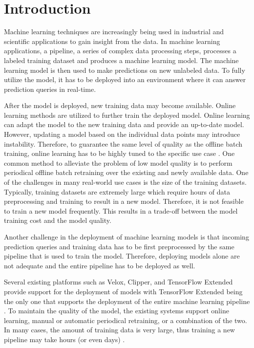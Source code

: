 \section{Introduction} \label{introduction}
Machine learning techniques are increasingly being used in industrial and scientific applications to gain insight from the data.
In machine learning applications, a pipeline, a series of complex data processing steps, processes a labeled training dataset and produces a machine learning model.
The machine learning model is then used to make predictions on new unlabeled data.
To fully utilize the model, it has to be deployed into an environment where it can answer prediction queries in real-time.

After the model is deployed, new training data may become available.
Online learning methods are utilized to further train the deployed model.
Online learning can adapt the model to the new training data and provide an up-to-date model.
However, updating a model based on the individual data points may introduce instability.
Therefore, to guarantee the same level of quality as the offline batch training, online learning has to be highly tuned to the specific use case \cite{ma2009identifying, macmahan2013}.
One common method to alleviate the problem of low model quality is to perform periodical offline batch retraining over the existing and newly available data.
One of the challenges in many real-world use cases is the size of the training datasets.
Typically, training datasets are extremely large which require hours of data preprocessing and training to result in a new model.
Therefore, it is not feasible to train a new model frequently.
This results in a trade-off between the model training cost and the model quality.

Another challenge in the deployment of machine learning models is that incoming prediction queries and training data has to be first preprocessed by the same pipeline that is used to train the model.
Therefore, deploying models alone are not adequate and the entire pipeline has to be deployed as well.

Several existing platforms such as Velox, Clipper, and TensorFlow Extended provide support for the deployment of models with TensorFlow Extended being the only one that supports the deployment of the entire machine learning pipeline \cite{crankshaw2014missing, crankshaw2016clipper, agarwal2014laser, baylor2017tfx}.
To maintain the quality of the model, the existing systems support online learning, manual or automatic periodical retraining, or a combination of the two.
In many cases, the amount of training data is very large, thus training a new pipeline may take hours (or even days) \cite{baylor2017tfx}.


